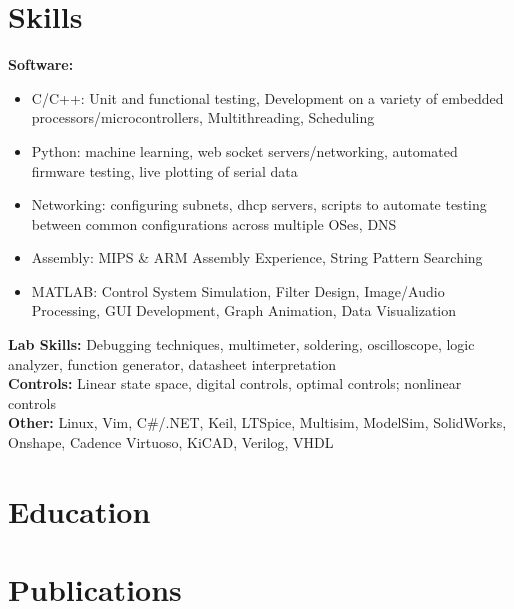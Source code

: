 \documentclass[11pt, a4paper]{article}
\begin{document}
\section*{Skills}
{\scriptsize
  \textbf{Software:}
  \begin{itemize}[noitemsep] %
    \item C/C++: Unit and functional testing, Development on a variety of embedded processors/microcontrollers, Multithreading, Scheduling
    \item Python: machine learning, web socket servers/networking, automated firmware testing, live plotting of serial data
    \item Networking: configuring subnets, dhcp servers, scripts to automate testing between common configurations across multiple OSes, DNS
    \item Assembly: MIPS \& ARM Assembly Experience, String Pattern Searching
    \item MATLAB: Control System Simulation, Filter Design, Image/Audio Processing, GUI Development, Graph Animation, Data Visualization
  \end{itemize}
  \textbf{Lab Skills:} Debugging techniques, multimeter, soldering, oscilloscope, logic analyzer, function generator, datasheet interpretation\\
  \textbf{Controls:} Linear state space, digital controls, optimal controls; nonlinear controls\\
  \textbf{Other:} Linux, Vim, C\#/.NET, Keil, LTSpice, Multisim, ModelSim, SolidWorks, Onshape, Cadence Virtuoso, KiCAD, Verilog, VHDL\par\noindent
}

\section*{Education}
{\scriptsize
  \educationWithDuration
}

\section*{Publications}
{\scriptsize
  \publications
}

\end{document}
